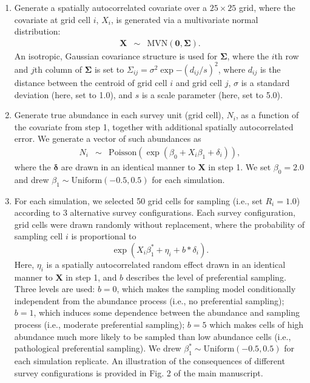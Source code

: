 \documentclass[times,mee,doublespace,]{besauth2}
\begin{document}
\begin{flushleft}
\begin{enumerate}
  \item Generate a spatially autocorrelated covariate over a $25 \times 25$ grid, where the covariate at grid cell $i$, $X_i$, is generated via a multivariate normal distribution:
      \begin{eqnarray}
        \textbf{X} & \sim & \textrm{MVN} (\textbf{0},\boldsymbol{\Sigma}).
        \label{eq:cov}
      \end{eqnarray}
      An isotropic, Gaussian covariance structure is used for $\boldsymbol{\Sigma}$, where the $i$th row and $j$th column of $\boldsymbol{\Sigma}$ is set to $\Sigma_{ij}=\sigma^2 \exp{-(d_{ij}/s)^2}$, where $d_{ij}$ is the distance between the centroid of grid cell $i$ and grid cell $j$, $\sigma$ is a standard deviation (here, set to 1.0), and $s$ is a scale parameter (here, set to 5.0).
  \item Generate true abundance in each survey unit (grid cell), $N_i$, as a function of the covariate from step 1, together with additional spatially autocorrelated error.  We generate a vector of such abundances as
      \begin{eqnarray}
        N_i & \sim & \textrm{Poisson}(\exp(\beta_0 + X_i \beta_1 + \delta_i)),
      \end{eqnarray}
      where the $\boldsymbol{\delta}$ are drawn in an identical manner to $\textbf{X}$ in step 1.  We set $\beta_0 = 2.0$ and drew $\beta_1 \sim \textrm{Uniform}(-0.5,0.5)$ for each simulation.
  \item For each simulation, we selected 50 grid cells for sampling (i.e., set $R_i = 1.0$) according to 3 alternative survey configurations.  Each survey configuration, grid cells were drawn randomly without replacement, where the probability of sampling cell $i$ is proportional to
      \begin{equation*}
        \exp(X_i \beta_1^*  + \eta_i + b*\delta_i).
      \end{equation*}      
      Here, $\eta_i$ is a spatially autocorrelated random effect drawn in an identical manner to $\textbf{X}$ in step 1, and $b$ describes the level of preferential sampling.  Three levels are used: $b=0$, which makes the sampling model conditionally independent from the abundance process (i.e., no preferential sampling); $b=1$, which induces some dependence between the abundance and sampling process (i.e., moderate preferential sampling); $b=5$ which makes cells of high abundance much more likely to be sampled than low abundance cells (i.e., pathological preferential sampling).   We drew $\beta_1^* \sim \textrm{Uniform}(-0.5,0.5)$ for each simulation replicate.  An illustration of the consequences of different survey configurations is provided in Fig. 2 of the main manuscript.

\end{enumerate}
\end{flushleft}
\end{document}
